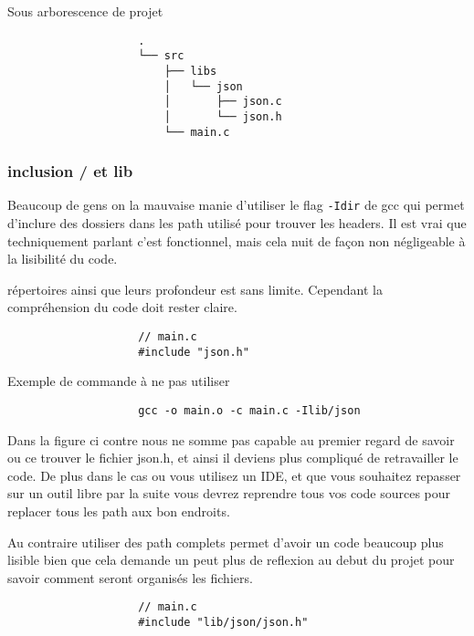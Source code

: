 			\begin{cbox}{Sous arborescence de projet}
				\begin{verbatim}
					.
					└── src
					    ├── libs
					    │   └── json
					    │       ├── json.c
					    │       └── json.h
					    └── main.c
				\end{verbatim}
			\end{cbox}

		\subsubsection{inclusion / et lib}
			Beaucoup de gens on la mauvaise manie d'utiliser le flag \verb+-Idir+ de gcc qui permet d'inclure des dossiers dans les path utilisé pour trouver les headers. Il est vrai que techniquement parlant c'est fonctionnel, mais cela nuit de façon non négligeable à la lisibilité du code.

			répertoires ainsi que leurs profondeur est sans limite. Cependant la compréhension du code doit rester claire.

			\begin{cbox}{}
				\begin{verbatim}
					// main.c
					#include "json.h"
				\end{verbatim}
			\end{cbox}

			\begin{cbox}{Exemple de commande à ne pas utiliser}
				\begin{verbatim}
					gcc -o main.o -c main.c -Ilib/json
				\end{verbatim}
			\end{cbox}

			Dans la figure ci contre nous ne somme pas capable au premier regard de savoir ou ce trouver le fichier json.h, et ainsi il deviens plus compliqué de retravailler le code. De plus dans le cas ou vous utilisez un IDE, et que vous souhaitez repasser sur un outil libre par la suite vous devrez reprendre tous vos code sources pour replacer tous les path aux bon endroits.

			Au contraire utiliser des path complets permet d'avoir un code beaucoup plus lisible bien que cela demande un peut plus de reflexion au debut du projet pour savoir comment seront organisés les fichiers.

			\begin{cbox}{}
				\begin{verbatim}
					// main.c
					#include "lib/json/json.h"
				\end{verbatim}
			\end{cbox}

